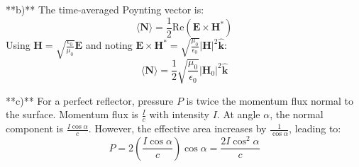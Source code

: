 \documentclass{article}
\begin{document}
**b)** The time-averaged Poynting vector is:
\[
\langle \mathbf{N} \rangle = \frac{1}{2} \text{Re}(\mathbf{E} \times \mathbf{H}^*)
\]
Using \(\mathbf{H} = \sqrt{\frac{\epsilon_0}{\mu_0}} \mathbf{E}\) and noting \(\mathbf{E} \times \mathbf{H}^* = \sqrt{\frac{\mu_0}{\epsilon_0}} |\mathbf{H}|^2 \hat{\mathbf{k}}\):
\[
\langle \mathbf{N} \rangle = \frac{1}{2} \sqrt{\frac{\mu_0}{\epsilon_0}} |\mathbf{H}_0|^2 \hat{\mathbf{k}}
\]

**c)** For a perfect reflector, pressure \(P\) is twice the momentum flux normal to the surface. Momentum flux is \(\frac{I}{c}\) with intensity \(I\). At angle \(\alpha\), the normal component is \(\frac{I \cos \alpha}{c}\). However, the effective area increases by \(\frac{1}{\cos \alpha}\), leading to:
\[
P = 2 \left(\frac{I \cos \alpha}{c}\right) \cos \alpha = \frac{2I \cos^2 \alpha}{c}
\]

\end{document}
